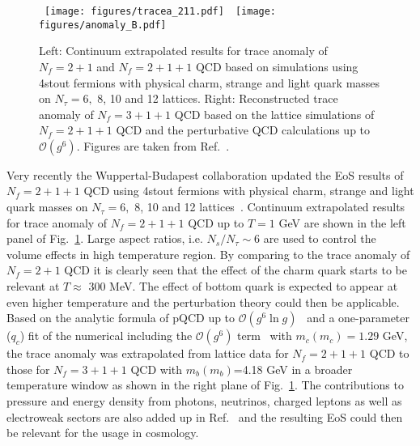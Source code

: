 \documentclass{PoS}
\begin{document}
\begin{figure}
\begin{center}
~\texttt{[image: figures/tracea\_211.pdf]}~~\texttt{[image: figures/anomaly\_B.pdf]}
\end{center}
\caption{Left: Continuum extrapolated results for trace anomaly of $N_f=2+1$ and $N_f=2+1+1$ QCD based on simulations using 4stout fermions with physical charm, strange and light quark masses on $N_\tau=6,$ 8, 10 and 12 lattices. Right: Reconstructed trace anomaly of $N_f=3+1+1$ QCD based on the lattice simulations of $N_f=2+1+1$ QCD and the perturbative QCD calculations up to $\mathcal{O}(g^6)$. Figures are taken from Ref.~\cite{Borsanyi:2016ksw}.}
\label{fig:EoScharm}
\end{figure}





Very recently the Wuppertal-Budapest collaboration updated the EoS results of $N_f=2+1+1$ QCD using 4stout fermions with physical charm, strange and light quark masses on $N_\tau=6,$ 8, 10 and 12 lattices~\cite{Borsanyi:2016ksw}.
Continuum extrapolated results for trace anomaly of $N_f=2+1+1$ QCD up to $T=1$ GeV are shown in the left panel of Fig.~\ref{fig:EoScharm}.  Large aspect ratios, i.e. $N_s/N_\tau\sim6$  are used to control the volume effects in high temperature region. By comparing to the trace anomaly of $N_f=2+1$ QCD it is clearly seen that the effect of the charm quark starts to be relevant at $T\approx$ 300 MeV. The effect of bottom quark is expected to appear at even higher temperature and the perturbation theory could then be applicable. Based on the analytic formula of pQCD up to $\mathcal{O}(g^6\ln g)$~\cite{Kajantie:2002wa} and  a one-parameter ($q_c$) fit of the numerical including the $\mathcal{O}(g^6)$ term~\cite{Hietanen:2008tv} with $m_c(m_c)=1.29$ GeV, the trace anomaly was extrapolated from lattice data for $N_f=2+1+1$ QCD to those for $N_f=3+1+1$ QCD with $m_b(m_b)$=4.18 GeV in a broader temperature window as shown in the right plane of Fig.~\ref{fig:EoScharm}. The contributions to pressure and energy density from photons, neutrinos, charged leptons as well as electroweak sectors are also added up in Ref.~\cite{Borsanyi:2016ksw} and the resulting EoS could then be relevant for the usage in cosmology.







\end{document}
